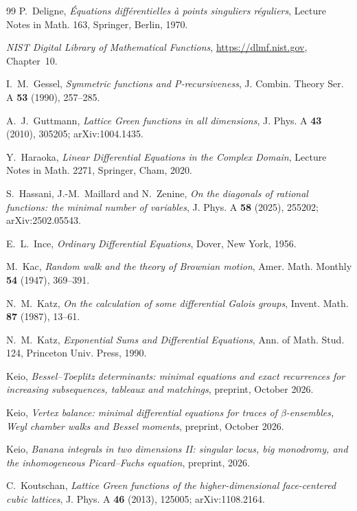 \documentclass[11pt]{amsart}
\theoremstyle{definition}
\begin{document}
\begin{thebibliography}{99}
P.~Deligne,
\emph{\'Equations diff\'erentielles \`a points singuliers r\'eguliers},
Lecture Notes in Math. 163, Springer, Berlin, 1970.

\emph{NIST Digital Library of Mathematical Functions}, \url{https://dlmf.nist.gov}, Chapter~10.

I.~M.~Gessel,
\emph{Symmetric functions and P-recursiveness},
J. Combin. Theory Ser. A \textbf{53} (1990), 257--285.

A.~J.~Guttmann,
\emph{Lattice Green functions in all dimensions},
J. Phys. A \textbf{43} (2010), 305205; arXiv:1004.1435.

Y.~Haraoka,
\emph{Linear Differential Equations in the Complex Domain},
Lecture Notes in Math. 2271, Springer, Cham, 2020.

S.~Hassani, J.-M.~Maillard and N.~Zenine,
\emph{On the diagonals of rational functions: the minimal number of variables},
J. Phys. A \textbf{58} (2025), 255202; arXiv:2502.05543.

E.~L.~Ince,
\emph{Ordinary Differential Equations},
Dover, New York, 1956.

M.~Kac,
\emph{Random walk and the theory of Brownian motion},
Amer. Math. Monthly \textbf{54} (1947), 369--391.

N.~M.~Katz,
\emph{On the calculation of some differential Galois groups},
Invent. Math. \textbf{87} (1987), 13--61.

N.~M.~Katz,
\emph{Exponential Sums and Differential Equations},
Ann. of Math. Stud. 124, Princeton Univ. Press, 1990.

Keio,
\emph{Bessel--Toeplitz determinants: minimal equations and exact recurrences for increasing subsequences, tableaux and matchings},
preprint, October 2026.

Keio,
\emph{Vertex balance: minimal differential equations for traces of $\beta$-ensembles, Weyl chamber walks and Bessel moments},
preprint, October 2026.

Keio,
\emph{Banana integrals in two dimensions II: singular locus, big monodromy, and the inhomogeneous Picard--Fuchs equation},
preprint, 2026.

C.~Koutschan,
\emph{Lattice Green functions of the higher-dimensional face-centered cubic lattices},
J. Phys. A \textbf{46} (2013), 125005; arXiv:1108.2164.


\end{thebibliography}
\end{document}
